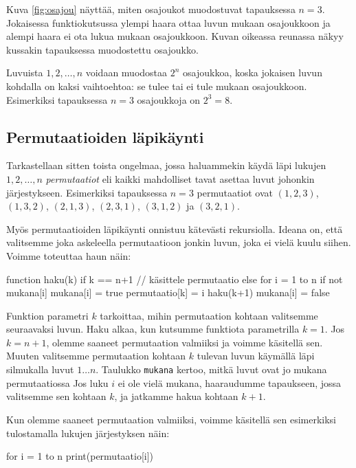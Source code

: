 Kuva \ref{fig:osajou} näyttää,
miten osajoukot muodostuvat tapauksessa $n=3$.
Jokaisessa funktiokutsussa ylempi haara ottaa luvun mukaan osajoukkoon
ja alempi haara ei ota lukua mukaan osajoukkoon.
Kuvan oikeassa reunassa näkyy kussakin tapauksessa muodostettu osajoukko.

Luvuista $1,2,\dots,n$ voidaan muodostaa $2^n$ osajoukkoa,
koska jokaisen luvun kohdalla on kaksi vaihtoehtoa:
se tulee tai ei tule mukaan osajoukkoon.
Esimerkiksi tapauksessa $n=3$ osajoukkoja on $2^3=8$.

\subsection{Permutaatioiden läpikäynti}


Tarkastellaan sitten toista ongelmaa, jossa haluammekin
käydä läpi lukujen $1,2,\dots,n$ \emph{permutaatiot}
eli kaikki mahdolliset tavat asettaa luvut johonkin järjestykseen.
Esimerkiksi tapauksessa $n=3$ permutaatiot ovat
$(1,2,3)$, $(1,3,2)$, $(2,1,3)$, $(2,3,1)$, $(3,1,2)$ ja $(3,2,1)$.

Myös permutaatioiden läpikäynti onnistuu kätevästi rekursiolla.
Ideana on, että valitsemme joka askeleella permutaatioon
jonkin luvun, joka ei vielä kuulu siihen.
Voimme toteuttaa haun näin:

\begin{code}
function haku(k)
    if k == n+1
        // käsittele permutaatio
    else
        for i = 1 to n
            if not mukana[i]
                mukana[i] = true
                permutaatio[k] = i
                haku(k+1)
                mukana[i] = false
\end{code}

Funktion parametri $k$ tarkoittaa, mihin permutaation kohtaan
valitsemme seuraavaksi luvun.
Haku alkaa, kun kutsumme funktiota parametrilla $k=1$.
Jos $k=n+1$, olemme saaneet permutaation valmiiksi
ja voimme käsitellä sen.
Muuten valitsemme permutaation kohtaan $k$ tulevan luvun
käymällä läpi silmukalla luvut $1 \dots n$.
Taulukko \texttt{mukana} kertoo, mitkä luvut
ovat jo mukana permutaatiossa
Jos luku $i$ ei ole vielä mukana, haaraudumme tapaukseen,
jossa valitsemme sen kohtaan $k$, ja jatkamme hakua kohtaan $k+1$.

Kun olemme saaneet permutaation valmiiksi,
voimme käsitellä sen esimerkiksi tulostamalla lukujen
järjestyksen näin:

\begin{code}
for i = 1 to n
    print(permutaatio[i])
\end{code}

